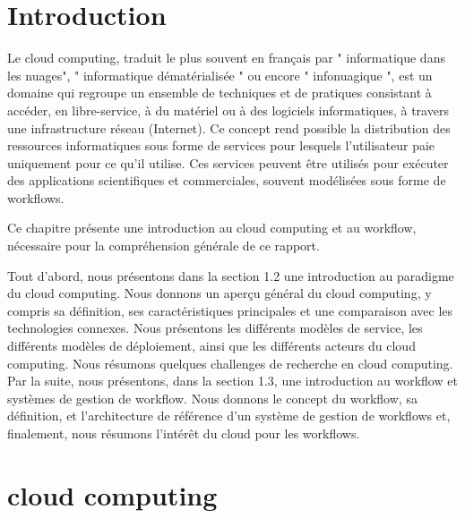  	 \section{Introduction}
 	  
    
    Le cloud computing, traduit le plus souvent en français par " informatique dans les nuages", " informatique dématérialisée " ou encore " infonuagique ", est un domaine qui regroupe un ensemble de techniques et de pratiques consistant à accéder, en libre-service, à du matériel ou à des logiciels informatiques, à travers une infrastructure réseau (Internet). Ce concept rend possible la distribution des ressources informatiques sous forme de services pour lesquels l'utilisateur paie uniquement pour ce qu'il utilise. Ces services peuvent être utilisés pour exécuter des applications scientifiques et commerciales, souvent modélisées sous forme de workflows.
     
    Ce chapitre présente une introduction au cloud computing et au workflow, nécessaire pour la compréhension générale de ce rapport.
    
    Tout d’abord, nous présentons dans la section 1.2 une introduction au paradigme du cloud computing. Nous donnons un aperçu général du cloud computing, y compris sa définition, ses caractéristiques principales et une comparaison avec les technologies connexes. Nous présentons les différents modèles de service, les différents modèles de déploiement, ainsi que les différents acteurs du cloud computing. Nous résumons quelques challenges de recherche en cloud computing. Par la suite, nous présentons, dans la section 1.3, une introduction au workflow et systèmes de gestion de workflow. Nous donnons le concept du workflow, sa définition, et l’architecture de référence d’un système de gestion de workflows et, finalement, nous résumons l’intérêt  du cloud pour les workflows.
    
    \section{cloud computing}
